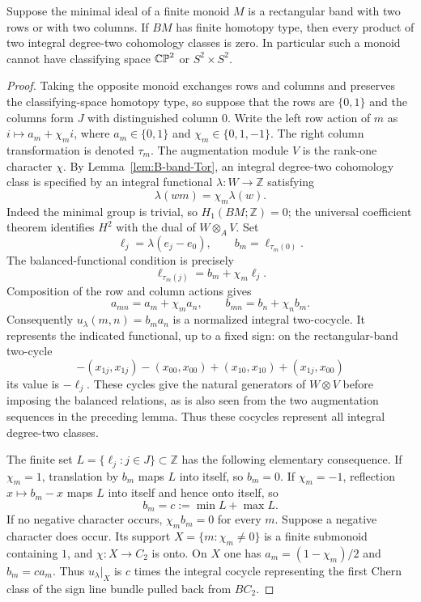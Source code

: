 \begin{proposition}\label{prop:B-two-row-products}
Suppose the minimal ideal of a finite monoid $M$ is a rectangular
band with two rows or with two columns.  If $BM$ has finite homotopy
type, then every product of two integral degree-two cohomology classes
is zero.  In particular such a monoid cannot have classifying space
$\mathbb {CP}^2$ or $S^2\times S^2$.
\end{proposition}
\begin{proof}
Taking the opposite monoid exchanges rows and columns and preserves
the classifying-space homotopy type, so suppose that the rows are
$\{0,1\}$ and the columns form $J$ with distinguished column $0$.
Write the left row action of $m$ as
$i\mapsto a_m+\chi_m i$, where
$a_m\in\{0,1\}$ and $\chi_m\in\{0,1,-1\}$.
The right column transformation is denoted $\tau_m$.
The augmentation module $V$ is the rank-one character $\chi$.
By Lemma~\ref{lem:B-band-Tor}, an integral degree-two cohomology
class is specified by an integral functional $\lambda:W\to\mathbb Z$
satisfying
\[
 \lambda(wm)=\chi_m\lambda(w).
\]
Indeed the minimal group is trivial, so $H_1(BM;\mathbb Z)=0$;
the universal coefficient theorem identifies $H^2$ with the dual of
$W\otimes_A V$.  Set
\[
 \ell_j=\lambda(e_j-e_0),\qquad
 b_m=\ell_{\tau_m(0)}.
\]
The balanced-functional condition is precisely
\[
 \ell_{\tau_m(j)}=b_m+\chi_m\ell_j.
\]
Composition of the row and column actions gives
\[
 a_{mn}=a_m+\chi_m a_n,\qquad
 b_{mn}=b_n+\chi_n b_m.
\]
Consequently $u_\lambda(m,n)=b_m a_n$ is a normalized integral
two-cocycle.  It represents the indicated functional, up to a fixed
sign: on the rectangular-band two-cycle
\[
 -(x_{1j},x_{1j})-(x_{00},x_{00})
 +(x_{10},x_{10})+(x_{1j},x_{00})
\]
its value is $-\ell_j$.  These cycles give the natural generators
of $W\otimes V$ before imposing the balanced relations, as is also
seen from the two augmentation sequences in the preceding lemma.
Thus these cocycles represent all integral degree-two classes.

The finite set $L=\{\ell_j:j\in J\}\subset\mathbb Z$ has the
following elementary consequence.  If $\chi_m=1$, translation by
$b_m$ maps $L$ into itself, so $b_m=0$.  If $\chi_m=-1$, reflection
$x\mapsto b_m-x$ maps $L$ into itself and hence onto itself, so
\[
 b_m=c:=\min L+\max L.
\]
If no negative character occurs, $\chi_m b_m=0$ for every $m$.
Suppose a negative character does occur.  Its support
$X=\{m:\chi_m\ne0\}$ is a finite submonoid containing $1$, and
$\chi:X\to C_2$ is onto.  On $X$ one has
$a_m=(1-\chi_m)/2$ and $b_m=ca_m$.
Thus $u_\lambda|_X$ is $c$ times the integral cocycle representing
the first Chern class of the sign line bundle pulled back from $BC_2$.


\end{proof}
